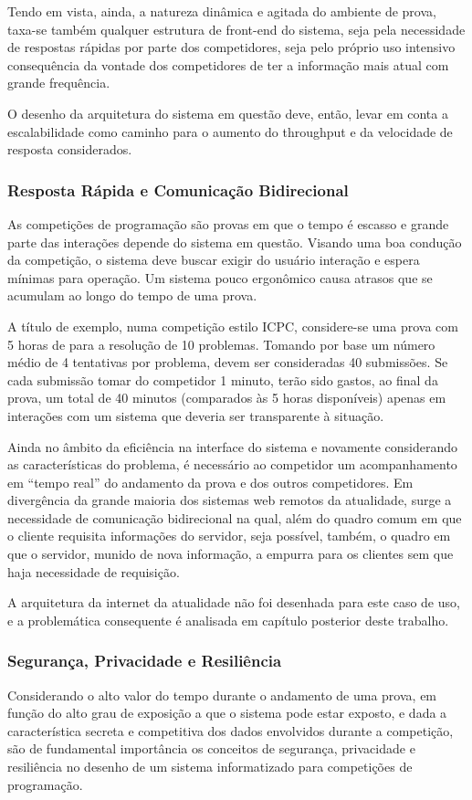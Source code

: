 \documentclass[ruledheader]{abnt}
\begin{document}
Tendo em vista, ainda, a natureza dinâmica e agitada do ambiente de prova, taxa-se também qualquer estrutura de front-end do sistema, seja pela necessidade de respostas rápidas por parte dos competidores, seja pelo próprio uso intensivo consequência da vontade dos competidores de ter a informação mais atual com grande frequência.

O desenho da arquitetura do sistema em questão deve, então, levar em conta a escalabilidade como caminho para o aumento do throughput e da velocidade de resposta considerados.

\subsubsection{Resposta Rápida e Comunicação Bidirecional}

As competições de programação são provas em que o tempo é escasso e grande parte das interações depende do sistema em questão. Visando uma boa condução da competição, o sistema deve buscar exigir do usuário interação e espera mínimas para operação. Um sistema pouco ergonômico causa atrasos que se acumulam ao longo do tempo de uma prova.

A título de exemplo, numa competição estilo ICPC, considere-se uma prova com 5 horas de para a resolução de 10 problemas. Tomando por base um número médio de 4 tentativas por problema, devem ser consideradas 40 submissões. Se cada submissão tomar do competidor 1 minuto, terão sido gastos, ao final da prova, um total de 40 minutos (comparados às 5 horas disponíveis) apenas em interações com um sistema que deveria ser transparente à situação.

Ainda no âmbito da eficiência na interface do sistema e novamente considerando as características do problema, é necessário ao competidor um acompanhamento em ``tempo real'' do andamento da prova e dos outros competidores. Em divergência da grande maioria dos sistemas web remotos da atualidade, surge a necessidade de comunicação bidirecional na qual, além do quadro comum em que o cliente requisita informações do servidor, seja possível, também, o quadro em que o servidor, munido de nova informação, a empurra para os clientes sem que haja necessidade de requisição.

A arquitetura da internet da atualidade não foi desenhada para este caso de uso, e a problemática consequente é analisada em capítulo posterior deste trabalho.

\subsubsection{Segurança, Privacidade e Resiliência}

Considerando o alto valor do tempo durante o andamento de uma prova, em função do alto grau de exposição a que o sistema pode estar exposto, e dada a característica secreta e competitiva dos dados envolvidos durante a competição, são de fundamental importância os conceitos de segurança, privacidade e resiliência no desenho de um sistema informatizado para competições de programação.


\end{document}
